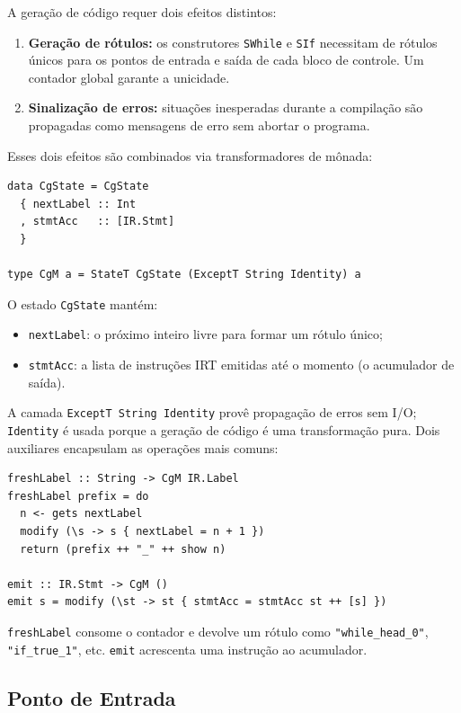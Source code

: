 A geração de código requer dois efeitos distintos:

\begin{enumerate}
  \item \textbf{Geração de rótulos:} os construtores \texttt{SWhile}
    e \texttt{SIf} necessitam de rótulos únicos para os pontos de entrada
    e saída de cada bloco de controle.  Um contador global garante a unicidade.
  \item \textbf{Sinalização de erros:} situações inesperadas durante a
    compilação são propagadas como mensagens de erro sem abortar o programa.
\end{enumerate}

Esses dois efeitos são combinados via transformadores de mônada:

\begin{verbatim}
data CgState = CgState
  { nextLabel :: Int
  , stmtAcc   :: [IR.Stmt]
  }

type CgM a = StateT CgState (ExceptT String Identity) a
\end{verbatim}

O estado \texttt{CgState} mantém:
\begin{itemize}
  \item \texttt{nextLabel}: o próximo inteiro livre para formar um rótulo único;
  \item \texttt{stmtAcc}: a lista de instruções IRT emitidas até o momento
    (o acumulador de saída).
\end{itemize}

A camada \texttt{ExceptT String Identity} provê propagação de erros sem I/O;
\texttt{Identity} é usada porque a geração de código é uma transformação pura.
Dois auxiliares encapsulam as operações mais comuns:

\begin{verbatim}
freshLabel :: String -> CgM IR.Label
freshLabel prefix = do
  n <- gets nextLabel
  modify (\s -> s { nextLabel = n + 1 })
  return (prefix ++ "_" ++ show n)

emit :: IR.Stmt -> CgM ()
emit s = modify (\st -> st { stmtAcc = stmtAcc st ++ [s] })
\end{verbatim}

\texttt{freshLabel} consome o contador e devolve um rótulo como
\texttt{"while\_head\_0"}, \texttt{"if\_true\_1"}, etc.
\texttt{emit} acrescenta uma instrução ao acumulador.

\subsection{Ponto de Entrada}\label{sec:ir-impl-entry}

